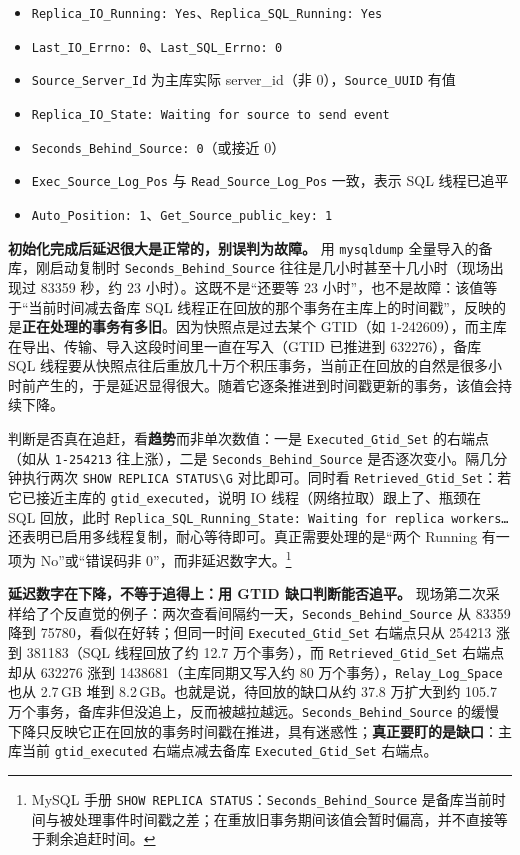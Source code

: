 \documentclass[12pt,UTF8]{ctexbook}
\begin{document}
\begin{itemize}
  \item \texttt{Replica\_IO\_Running: Yes}、\texttt{Replica\_SQL\_Running: Yes}
  \item \texttt{Last\_IO\_Errno: 0}、\texttt{Last\_SQL\_Errno: 0}
  \item \texttt{Source\_Server\_Id} 为主库实际 server\_id（非 0），\texttt{Source\_UUID} 有值
  \item \texttt{Replica\_IO\_State: Waiting for source to send event}
  \item \texttt{Seconds\_Behind\_Source: 0}（或接近 0）
  \item \texttt{Exec\_Source\_Log\_Pos} 与 \texttt{Read\_Source\_Log\_Pos} 一致，表示 SQL 线程已追平
  \item \texttt{Auto\_Position: 1}、\texttt{Get\_Source\_public\_key: 1}
\end{itemize}

\textbf{初始化完成后延迟很大是正常的，别误判为故障。} 用 \texttt{mysqldump} 全量导入的备库，刚启动复制时 \texttt{Seconds\_Behind\_Source} 往往是几小时甚至十几小时（现场出现过 83359 秒，约 23 小时）。这既不是“还要等 23 小时”，也不是故障：该值等于“当前时间减去备库 SQL 线程正在回放的那个事务在主库上的时间戳”，反映的是\textbf{正在处理的事务有多旧}。因为快照点是过去某个 GTID（如 1-242609），而主库在导出、传输、导入这段时间里一直在写入（GTID 已推进到 632276），备库 SQL 线程要从快照点往后重放几十万个积压事务，当前正在回放的自然是很多小时前产生的，于是延迟显得很大。随着它逐条推进到时间戳更新的事务，该值会持续下降。

判断是否真在追赶，看\textbf{趋势}而非单次数值：一是 \texttt{Executed\_Gtid\_Set} 的右端点（如从 \texttt{1-254213} 往上涨），二是 \texttt{Seconds\_Behind\_Source} 是否逐次变小。隔几分钟执行两次 \verb|SHOW REPLICA STATUS\G| 对比即可。同时看 \texttt{Retrieved\_Gtid\_Set}：若它已接近主库的 \texttt{gtid\_executed}，说明 IO 线程（网络拉取）跟上了、瓶颈在 SQL 回放，此时 \texttt{Replica\_SQL\_Running\_State: Waiting for replica workers\ldots} 还表明已启用多线程复制，耐心等待即可。真正需要处理的是“两个 Running 有一项为 No”或“错误码非 0”，而非延迟数字大。\footnote{MySQL 手册 \texttt{SHOW REPLICA STATUS}：\texttt{Seconds\_Behind\_Source} 是备库当前时间与被处理事件时间戳之差；在重放旧事务期间该值会暂时偏高，并不直接等于剩余追赶时间。}

\textbf{延迟数字在下降，不等于追得上：用 GTID 缺口判断能否追平。} 现场第二次采样给了个反直觉的例子：两次查看间隔约一天，\texttt{Seconds\_Behind\_Source} 从 83359 降到 75780，看似在好转；但同一时间 \verb|Executed_Gtid_Set| 右端点只从 254213 涨到 381183（SQL 线程回放了约 12.7 万个事务），而 \verb|Retrieved_Gtid_Set| 右端点却从 632276 涨到 1438681（主库同期又写入约 80 万个事务），\texttt{Relay\_Log\_Space} 也从 2.7\,GB 堆到 8.2\,GB。也就是说，待回放的缺口从约 37.8 万扩大到约 105.7 万个事务，备库非但没追上，反而被越拉越远。\texttt{Seconds\_Behind\_Source} 的缓慢下降只反映它正在回放的事务时间戳在推进，具有迷惑性；\textbf{真正要盯的是缺口}：主库当前 \texttt{gtid\_executed} 右端点减去备库 \texttt{Executed\_Gtid\_Set} 右端点。
\end{document}

